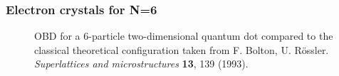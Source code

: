 \begin{frame}
\frametitle{Electron crystals for N=6}
 \begin{figure}
 \begin{center}
  \label{fig:wigner20}
  \caption{OBD for a 6-particle two-dimensional quantum dot compared to the classical theoretical configuration taken from F. Bolton, U. Rössler.  \textit{Superlattices and microstructures} \textbf{13}, 139 (1993).}
 \end{center}
\end{figure}
\end{frame}

